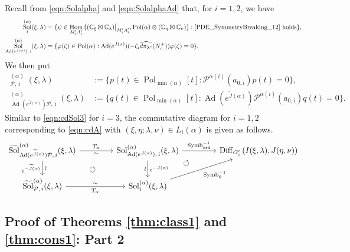 \documentclass[a4paper,11pt,reqno]{amsart}
\newcommand{\CC}{\mathbb{C}}
\newcommand{\calP}{\mathcal{P}}
\newcommand{\0}{{\bf 0}}
\newcommand{\1}{{\bf 1}}
\DeclareMathOperator{\Ad}{Ad}
\DeclareMathOperator{\Hom}{Hom}
\DeclareMathOperator{\Pol}{Pol}
\newcommand{\ord}{{\mathrm{ord}}}
\DeclareMathOperator{\Diff}{Diff}
\DeclareMathOperator{\Sol}{Sol}
\newcommand{\wJ}{\widetilde{J}}
\DeclareMathOperator{\Symb}{Symb}
\DeclareMathOperator{\wSol}{\widetilde{\Sol}}
\theoremstyle{plain}
\theoremstyle{definition}
\numberwithin{equation}{section}
\theoremstyle{definition}
\begin{document}
Recall from \eqref{eqn:Solalpha} and \eqref{eqn:SolalphaAd} that,
for $i=1,2$,  we have
\begin{align*}
\Sol_i^{(\alpha)}(\xi,\lambda) &= \{ \psi \in \Hom_{M_i'A_i'}\big((\CC_\xi\boxtimes \CC_{\lambda})\big\rvert_{M_i'A_i'},\Pol(\alpha)\otimes (\CC_\eta\boxtimes \CC_{\nu})\big) : \eqref{PDE_SymmetryBreaking_12} \text{ holds}\},\\
\Sol_{\Ad(e^{J(\alpha)}),\,i}^{(\alpha)}(\xi,\lambda)
&=\{\varphi(\zeta) \in \Pol(\alpha) : 
\Ad(e^{J(\alpha)})(-\zeta_i\widehat{d\pi_{\lambda^*}}(N_i^+))\varphi(\zeta)=0\}.
\end{align*}
We then put
\begin{align}
\wSol_{\calP,\, i}^{(\alpha)}(\xi,\lambda) &:= \{p(t) \in \Pol_{\min(\alpha)}[t] : 
\calP^{\alpha(i)}(a_{0,i})p(t) = 0\},\label{eqn:Sol_tilde_i}\\
\wSol_{\Ad(e^{\wJ(\alpha)}) \calP,\, i}^{(\alpha)}(\xi,\lambda)
&:=\{q(t) \in \Pol_{\min(\alpha)}[t] : 
\Ad(e^{\wJ(\alpha)})\calP^{\alpha(i)}(a_{0,i})q(t)=0\}. \nonumber
\end{align}
Similar to \eqref{eqn:cdSol3} for $i=3$,
the commutative diagram for $i=1,2$
corresponding to \eqref{eqn:cdA} with $(\xi, \eta; \lambda, \nu) \in L_i(\alpha)$
is given as follows.
\begin{equation}\label{eqn:conjTsec9}
\begin{tikzcd}[column sep=1.5cm]
	{\wSol_{\Ad(e^{\wJ(\alpha)}) \calP,\, i}^{(\alpha)}(\xi,\lambda)} & 
	\Sol_{\Ad(e^{J(\alpha)}),\,i}^{(\alpha)}(\xi,\lambda)  	
	\arrow[dl, pos=0.5, phantom, "\circlearrowleft"]
	&{\Diff_{G_i^\prime}\left(I(\xi, \lambda), J(\eta, \nu)\right)} \\
	{\wSol_{\calP,\, i}^{(\alpha)}(\xi,\lambda)}  & {\Sol_i^{(\alpha)}(\xi,\lambda)} &
	\arrow[ul, pos=0.886, phantom, "\circlearrowleft"]
	\arrow["\Symb_{\ord}^{-1}",  from=1-2, to=1-3]
	\arrow[ "\Symb_0^{-1}"', from=2-2, to=1-3]
	\arrow["{T_\alpha}", "\sim"' , from=1-1, to=1-2]
	\arrow["\sim" sloped, "e^{-\wJ(\alpha)}"', from=1-1, to=2-1]
	\arrow["e^{-J(\alpha)}", "\sim"' sloped,  from=1-2, to=2-2]
	\arrow["\sim" , "{T_\alpha}"',  from=2-1, to=2-2]
\end{tikzcd}
\end{equation}


\subsection{Proof of  Theorems \texorpdfstring{\ref{thm:class1}}{9.7} and \texorpdfstring{\ref{thm:cons1}}{9.9}: Part 2} 
\label{sec:Thms12B}
\end{document}
